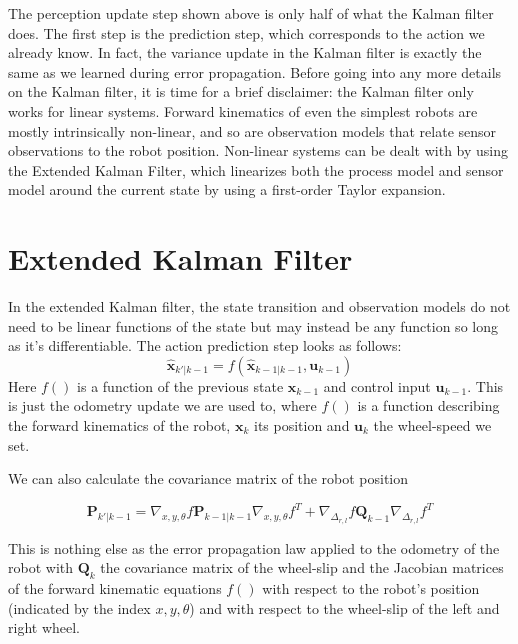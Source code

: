 The perception update step shown above is only half of what the Kalman filter does. The first step is the prediction step, which corresponds to the action we already know. In fact, the variance update in the Kalman filter is exactly the same as we learned during error propagation. Before going into any more details on the Kalman filter, it is time for a brief disclaimer: the Kalman filter only works for linear systems. Forward kinematics of even the simplest robots are mostly intrinsically non-linear, and so are observation models that relate sensor observations to the robot position. Non-linear systems can be dealt with by using the Extended Kalman Filter, which linearizes both the process model and sensor model around the current state by using a first-order Taylor expansion.

\section{Extended Kalman Filter}\label{sec:EKF}
In the extended Kalman filter, the state transition and observation models do not need to be linear functions of the state but may instead be any function so long as it's differentiable. The action prediction step looks as follows:
\begin{equation}
\hat{\boldsymbol{x}}_{k'|k-1} = f(\hat{\boldsymbol{x}}_{k-1|k-1}, \boldsymbol{u}_{k-1})
\end{equation}
Here $ f()$ is a function of the previous state $ \boldsymbol{x}_{k-1}$ and control input $ \boldsymbol{u}_{k-1}$. This is just the odometry update we are used to, where $ f()$ is a function describing the forward kinematics of the robot, $ \boldsymbol{x}_k$ its position and $ \boldsymbol{u}_k$ the wheel-speed we set.

We can also calculate the covariance matrix of the robot position

\begin{equation}
\boldsymbol{P}_{k'|k-1} = \nabla_{x,y,\theta}f \boldsymbol{P}_{k-1|k-1}\nabla_{x,y,\theta}f^T + \nabla_{\Delta_{r,l}}f\boldsymbol{Q}_{k-1}\nabla_{\Delta_{r,l}}f^T
\end{equation}

This is nothing else as the error propagation law applied to the odometry of the robot with $ \boldsymbol{Q}_k$ the covariance matrix of the wheel-slip and the Jacobian matrices of the forward kinematic equations $ f()$ with respect to the robot's position (indicated by the index $ x,y,\theta$) and with respect to the wheel-slip of the left and right wheel.

